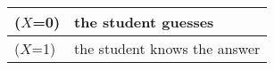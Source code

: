 \begin{tabular}{|l|l|} \hline
($X$=0)& the student guesses\\ \hline
($X$=1)& the student knows the answer  \\ \hline
\end{tabular}\\\\
